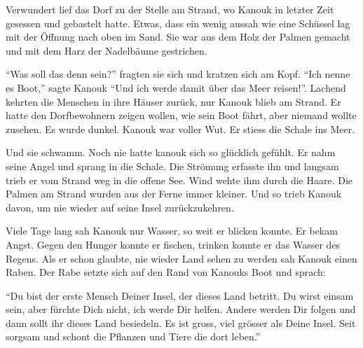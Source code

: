 Verwundert lief das Dorf zu der Stelle am Strand, wo Kanouk in letzter Zeit gesessen und gebastelt hatte. Etwas, dass ein wenig aussah wie eine Schüssel lag mit der Öffnung nach oben im Sand. Sie war aus dem Holz der Palmen gemacht und mit dem Harz der Nadelbäume gestrichen. 

\enquote{Was soll das denn sein?} fragten sie sich und kratzen sich am Kopf. \enquote{Ich nenne es Boot,} sagte Kanouk \enquote{Und ich werde damit über das Meer reisen!}. Lachend kehrten die Menschen in ihre Häuser zurück, nur Kanouk blieb am Strand. Er hatte den Dorfbewohnern zeigen wollen, wie sein Boot fährt, aber niemand wollte zusehen. Es wurde dunkel. Kanouk war voller Wut. Er stiess die Schale ins Meer.

Und sie schwamm. Noch nie hatte kanouk sich so glücklich gefühlt. Er nahm seine Angel und sprang in die Schale. Die Strömung erfasste ihn und langsam trieb er vom Strand weg in die offene See. Wind wehte ihm durch die Haare. Die Palmen am Strand wurden aus der Ferne immer kleiner. Und so trieb Kanouk davon, um nie wieder auf seine Insel zurückzukehren.

Viele Tage lang sah Kanouk nur Wasser, so weit er blicken konnte. Er bekam Angst. Gegen den Hunger konnte er fischen, trinken konnte er das Wasser des Regens. Als er schon glaubte, nie wieder Land sehen zu werden sah Kanouk einen Raben. Der Rabe setzte sich auf den Rand von Kanouks Boot und sprach:

\enquote{Du bist der erste Mensch Deiner Insel, der dieses Land betritt. Du wirst einsam sein, aber fürchte Dich nicht, ich werde Dir helfen. Andere werden Dir folgen und dann sollt ihr dieses Land besiedeln. Es ist gross, viel grösser als Deine Insel. Seit sorgsam und schont die Pflanzen und Tiere die dort leben.}
